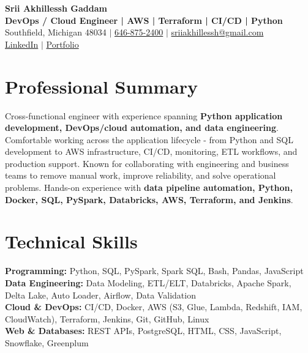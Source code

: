 \documentclass[letterpaper,10pt]{article}
\begin{document}
\fontsize{9.35pt}{10.45pt}\selectfont

\begin{center}
    {\LARGE \textbf{Srii Akhillessh Gaddam}} \\[-1pt]
    \textbf{DevOps / Cloud Engineer | AWS | Terraform | CI/CD | Python} \\[2pt]
    Southfield, Michigan 48034 $|$
    \href{tel:6468752400}{646-875-2400} $|$
    \href{mailto:sriiakhillessh@gmail.com}{sriiakhillessh@gmail.com} \\[1pt]
    \href{https://www.linkedin.com/in/srii-akhiilessh-gaddam-b48668191/}{LinkedIn} $|$
    \href{https://sriiakhillesshg.github.io/portfolio/}{Portfolio}
\end{center}
\vspace{-8pt}

\section{Professional Summary}
\small{Cross-functional engineer with experience spanning \textbf{Python application development, DevOps/cloud automation, and data engineering}. Comfortable working across the application lifecycle - from Python and SQL development to AWS infrastructure, CI/CD, monitoring, ETL workflows, and production support. Known for collaborating with engineering and business teams to remove manual work, improve reliability, and solve operational problems. Hands-on experience with \textbf{data pipeline automation, Python, Docker, SQL, PySpark, Databricks, AWS, Terraform, and Jenkins}.}

\section{Technical Skills}
\small{
\textbf{Programming:} Python, SQL, PySpark, Spark SQL, Bash, Pandas, JavaScript \\
\textbf{Data Engineering:} Data Modeling, ETL/ELT, Databricks, Apache Spark, Delta Lake, Auto Loader, Airflow, Data Validation \\
\textbf{Cloud \& DevOps:} CI/CD, Docker, AWS (S3, Glue, Lambda, Redshift, IAM, CloudWatch), Terraform, Jenkins, Git, GitHub, Linux \\
\textbf{Web \& Databases:} REST APIs, PostgreSQL, HTML, CSS, JavaScript, Snowflake, Greenplum
}
\end{document}

